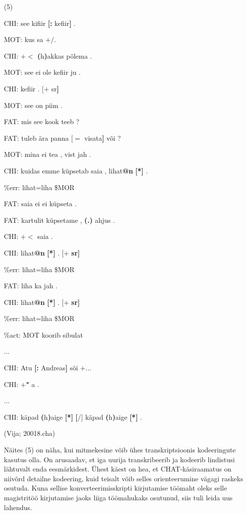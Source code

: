 \documentclass[12pt]{article}
\begin{document}
(5)
\begin{description}
    \item*CHI:   see kifiir \textbf{[:} kefiir\textbf{]} .
    \item*MOT:   kus sa $\pmb{+/}$.
    \item*CHI:   $\pmb{+<}$ \textbf{(}h\textbf{)}akkas põlema .
    \item*MOT:   see ei ole kefiir ju .
    \item*CHI:   kefiir . $\pmb{[+}$ sr\textbf{]}
    \item*MOT:   see on piim .
    \item*FAT:   mis see kook teeb ?
    \item*FAT:   tuleb ära panna $\pmb{[=}$ visata\textbf{]} või ?
    \item*MOT:   mina ei tea , vist jah .
    \item*CHI:   kuidas emme küpsetab saia , lihat\textbf{@n} \textbf{[*]} .
    \item\%err:   lihat=liha \$MOR
    \item*FAT:   saia ei ei küpseta .
    \item*FAT:   kartulit küpsetame , \textbf{(.)} ahjus .
    \item*CHI:   $\pmb{+<}$ saia .
    \item*CHI:   lihat\textbf{@n} \textbf{[*]} . $\pmb{[+}$ \textbf{sr]}
    \item\%err:   lihat=liha \$MOR
    \item*FAT:   liha ka jah .
    \item*CHI:   lihat\textbf{@n} \textbf{[*]} . $\pmb{[+}$ \textbf{sr]}
    \item\%err:   lihat=liha \$MOR
    \item\%act:   MOT koorib sibulat
    \item...
    \item*CHI:   Atu \textbf{[:} Andreas\textbf{]} sõi $\pmb{+...}$
    \item*CHI:   $\pmb{+}$\textbf{"} a .
    \item...
    \item*CHI:   käpad \textbf{(}h\textbf{)}aige \textbf{[*]} \textbf{[$\pmb{/]}$} käpad \textbf{(}h\textbf{)}aige \textbf{[*]} .
    \item (Vija; 20018.cha)
\end{description}


Näites (5) on näha, kui mitmekesine võib ühes transkriptsioonis kodeeringute kasutus olla. On arusaadav, et iga uurija transkribeerib ja kodeerib lindistusi lähtuvalt enda eesmärkidest. Ühest käest on hea, et CHAT-käsiraamatus on niivõrd detailne kodeering, kuid teisalt võib selles orienteerumine vägagi raskeks osutuda. Kuna sellise konverteerimisskripti kirjutamise töömaht oleks selle magistritöö kirjutamise jaoks liiga töömahukaks osutunud, siis tuli leida uus lahendus. 
\end{document}
